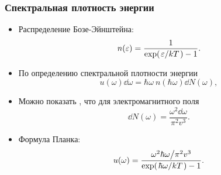 \documentclass{beamer}
\begin{document}

    \begin{frame}\frametitle{Спектральная плотность энергии}

        \begin{itemize}
            \item Распределение Бозе-Эйнштейна:
            \begin{equation}\label{eq:n_of_eps}
                n(\varepsilon) = \frac{1}{\exp(\flatfrac{\varepsilon}{kT}) - 1} .
            \end{equation}

            \item По определению спектральной плотности энергии
            \begin{equation}\label{eq:psd}
                u(\omega) \dd{\omega} = \hbar\omega\ n(\hbar\omega) \dd{N(\omega)} ,
            \end{equation}

            \item Можно показать \cite{sivuhin_opt}, что для электромагнитного поля
            \begin{equation}\label{eq:dN_of_eps_cont}
                \dd{N(\omega)} = \frac{\omega^2 \dd{\omega}}{\pi^2 v^3} .
            \end{equation}

            \item Формула Планка:
            \begin{equation}
                u(\omega) = \frac{
                        \flatfrac{\omega^2 \hbar\omega}{\pi^2 v^3}
                }{\exp(\flatfrac{\hbar\omega}{kT}) - 1} .
            \end{equation}

        \end{itemize}

    \end{frame}

\end{document}
